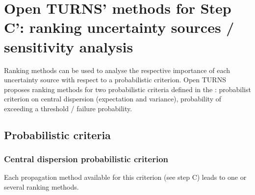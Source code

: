 
\newpage

\newpage

\newpage

\newpage

\newpage

\newpage

\newpage

\newpage

\newpage

\newpage

\newpage

\newpage

\newpage

\newpage

\newpage

\newpage

\newpage

\newpage

\newpage

\newpage

\newpage

\newpage

\section{Open TURNS' methods for Step C': ranking uncertainty sources / sensitivity analysis}

Ranking methods can be used to analyse the respective importance of each uncertainty source with respect to a probabilistic criterion.
Open TURNS proposes ranking methods for two probabilistic criteria defined in the : probabilist criterion on central dispersion (expectation and variance), probability of exceeding a threshold / failure probability.

\subsection{Probabilistic criteria}

\subsubsection{Central dispersion probabilistic criterion}

Each propagation method available for this criterion (see step C) leads to one or several ranking methods.

